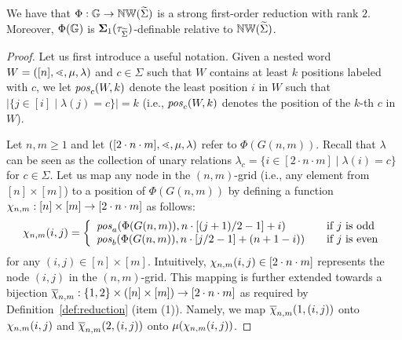 \documentclass{LMCS}
\begin{document}
\begin{prop}\label{prop:reduction}
  We have that $\Phi: \mathbb{G} \rightarrow \mathbb{NW}(\widetilde{\Sigma})$ is a strong
  first-order reduction with rank $2$. Moreover, $\Phi(\mathbb{G})$ is
  ${\bf{\Sigma}}_1(\tau_{\widetilde{\Sigma}})$-definable relative to $\mathbb{NW}(\widetilde{\Sigma})$.
\end{prop}

\begin{proof}
  Let us first introduce a useful notation. Given a nested word
  $W=([n],\mathord{\lessdot},\mu,\lambda)$ and $c \in \Sigma$ such that $W$ contains at
  least $k$ positions labeled with $c$, we let $\mathit{pos}_c(W,k)$ denote the least
  position $i$ in $W$ such that $|\{j \in [i] \mid \lambda(j) = c\}| = k$
  (i.e., $\mathit{pos}_c(W,k)$ denotes the position of the $k$-th $c$ in $W$).

  Let $n,m \ge 1$ and let $([2 \cdot n \cdot m],\mathord{\lessdot},\mu,\lambda)$ refer
  to $\Phi(G(n,m))$. Recall that $\lambda$ can be seen as the collection of
  unary relations $\lambda_c = \{i \in [2 \cdot n \cdot m] \mid \lambda(i) =
  c\}$ for $c \in \Sigma$.
Let us map any node in the $(n,m)$-grid (i.e., any element from $[n] \times
  [m]$) to a position of $\Phi(G(n,m))$ by defining a function $\chi_{n,m}: [n]
  \times [m] \rightarrow [2 \cdot n \cdot m]$ as follows:
\[
\chi_{n,m}(i,j) = \left\{
  \begin{array}{ll}
      \mathit{pos}_a(\Phi(G(n,m)),n \cdot [(j+1)/2 - 1] + i) & ~~ \text{~if~} j \text{~is~odd}\\
      \mathit{pos}_b(\Phi(G(n,m)),n \cdot [j/2 - 1] + (n + 1 - i)) & ~~ \text{~if~} j \text{~is~even}
    \end{array}
\right.
\]
for any $(i,j) \in [n] \times [m]$. Intuitively, $\chi_{n,m}(i,j) \in [2 \cdot n
\cdot m]$ represents the node $(i,j)$ in the $(n,m)$-grid. This mapping is
further extended towards a bijection $\overline{\chi}_{n,m}: \{1,2\} \times ([n] \times
[m]) \rightarrow [2 \cdot n \cdot m]$ as required by
Definition~\ref{def:reduction} (item (1)). Namely, we map $\overline{\chi}_{n,m}(1,(i,j))$
onto $\chi_{n,m}(i,j)$ and $\overline{\chi}_{n,m}(2,(i,j))$ onto $\mu(\chi_{n,m}(i,j))$.


\end{proof}
\end{document}
